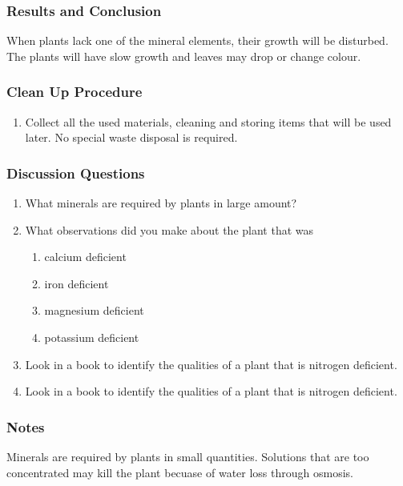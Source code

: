 \subsubsection*{Results and Conclusion}
When plants lack one of the mineral elements, their growth will be disturbed. The plants will have slow growth and leaves may drop or change colour.
\subsubsection*{Clean Up Procedure}
\begin{enumerate}
\item{Collect all the used materials, cleaning and storing items that will be used later.  No special waste disposal is required.}
\end{enumerate}
\subsubsection*{Discussion Questions}
\begin{enumerate}
\item{What minerals are required by plants in large amount?}
\item{What observations did you make about the plant that was} 
\begin{enumerate}
\item{calcium deficient}
\item{iron deficient}
\item{magnesium deficient}
\item{ potassium deficient}
\end{enumerate}
\item{Look in a book to identify the qualities of a plant that is nitrogen deficient.}
\item{Look in a book to identify the qualities of a plant that is nitrogen deficient.}
\end{enumerate}
\subsubsection*{Notes}
Minerals are required by plants in small quantities. Solutions that are too concentrated may kill the plant becuase of water loss through osmosis.
